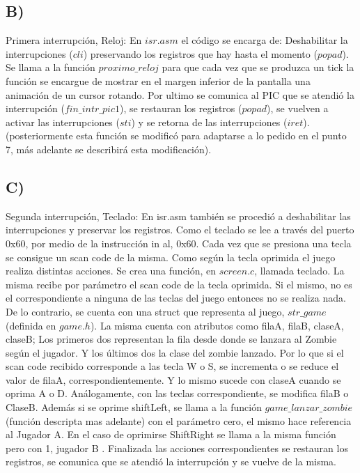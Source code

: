 \subsection*{B)}
Primera interrupci\'on, Reloj: \newline
En $isr.asm$  el c\'odigo se encarga de:\newline
Deshabilitar la interrupciones ($cli$) preservando los registros que hay hasta el momento ($popad$). Se llama a la funci\'on $proximo\_reloj$ para que cada vez que se produzca un 
tick la funci\'on se encargue de mostrar en el margen inferior de la pantalla una animaci\'on de un cursor rotando. Por ultimo se comunica al PIC que se atendi\'o la interrupci\'on 
($fin\_intr\_pic1$), se restauran los registros ($popad$), se vuelven a activar las interrupciones ($sti$) y se retorna de las interrupciones ($iret$). (posteriormente esta 
funci\'on se modific\'o para adaptarse a lo pedido en el punto 7, m\'as adelante se describir\'a esta modificaci\'on).

\subsection*{C)}
Segunda interrupci\'on, Teclado: \newline
En isr.asm tambi\'en se procedi\'o a deshabilitar las interrupciones y preservar los registros. Como el teclado se lee a trav\'es  del puerto 0x60, por medio de la 
instrucci\'on in al, 0x60. Cada vez que se presiona una tecla se consigue un scan code de la misma. Como seg\'un la tecla oprimida el juego realiza distintas acciones. Se crea 
una funci\'on, en $screen.c$,  llamada teclado. La misma recibe por par\'ametro el scan code de la tecla oprimida.  Si el mismo, no es el correspondiente a ninguna de las teclas 
del juego entonces no se realiza nada. De lo contrario,  se cuenta con una struct que representa al juego, $str\_game$ (definida en $game.h$). La misma cuenta con atributos como 
filaA,  filaB,  claseA,  claseB; Los primeros dos representan la fila desde donde se lanzara al Zombie seg\'un el jugador. Y los \'ultimos dos la clase del zombie lanzado. Por lo 
que si el scan code recibido corresponde a las tecla W o S, se incrementa o se reduce el valor de  filaA, correspondientemente. Y lo mismo sucede con claseA cuando se oprima A o D. 
An\'alogamente, con las teclas correspondiente, se modifica filaB o ClaseB. Adem\'as si se oprime shiftLeft, se llama a la funci\'on $game\_lanzar\_zombie$ (funci\'on descripta mas 
adelante) con el par\'ametro cero, el mismo hace referencia al Jugador A. En el caso de oprimirse ShiftRight se llama a la misma funci\'on pero con 1, jugador B .  
Finalizada las acciones correspondientes se restauran los registros, se comunica que se atendi\'o la interrupci\'on y se vuelve de la misma.


